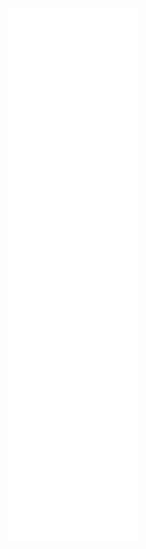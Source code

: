 \begin{figure}[H]
\begin{center}
\leavevmode
\includegraphics[height=400pt]{classDialStateHandler__coll__graph}
\end{center}
\end{figure}
